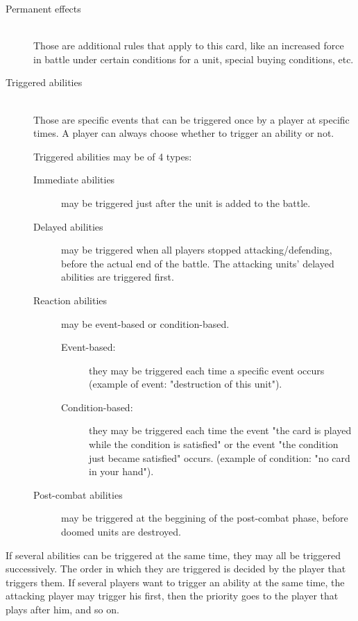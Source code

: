 \documentclass[a4paper]{article}
\begin{document}
    \begin{description}
        \item[Permanent effects] \hfill \\
        	Those are additional rules that apply to this card,
            like an increased force in battle under certain conditions for a unit,
            special buying conditions, etc.
        \item[Triggered abilities] \hfill \\
        	Those are specific events that can be triggered once by a player at specific times.
            A player can always choose whether to trigger an ability or not.
            
            Triggered abilities may be of 4 types:
            \begin{description}
        	        \item[Immediate abilities]
                    	may be triggered just after the unit is added to the battle.
        	        \item[Delayed abilities]
                    may be triggered when all players stopped attacking/defending,
	            before the actual end of the battle. The attacking units' delayed abilities are triggered first.
        	        \item[Reaction abilities] may be event-based or condition-based.
	            \begin{description}
                        \item[Event-based:] they may be triggered each time a specific event occurs
                        (example of event: "destruction of this unit").
                        \item[Condition-based:] they may be triggered each time the event
                        "the card is played while the condition is satisfied" or the event
                        "the condition just became satisfied" occurs.
                        (example of condition: "no card in your hand").
                    \end{description}
        	        \item[Post-combat abilities] may be triggered at the beggining of the
                    post-combat phase, before doomed units are destroyed.
            \end{description}
    \end{description}
    
\newpage
    If several abilities can be triggered at the same time, they may all be triggered successively.
    The order in which they are triggered is decided by the player that triggers them.
    If several players want to trigger an ability at the same time, the attacking player
    may trigger his first, then the priority goes to the player that plays after him, and so on.
    
\end{document}
